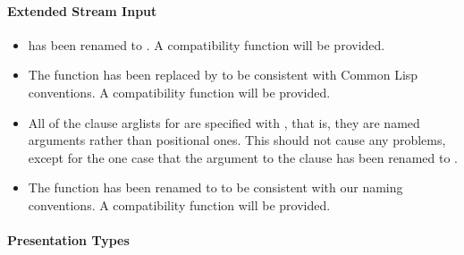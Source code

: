 \paragraph {Extended Stream Input}

\begin{itemize}
\item {} has been renamed to
.  A compatibility function will be provided.

\item The function  has been replaced by
 to be consistent with Common Lisp
conventions.  A compatibility function will be provided.

\item All of the clause arglists for  are specified with
\key, that is, they are named arguments rather than positional ones.  This
should not cause any problems, except for the one case that the 
argument to the  clause has been renamed to .

\item The function  has been renamed to
 to be consistent with our naming conventions.  A
compatibility function will be provided.
\end{itemize}


\paragraph {Presentation Types}

